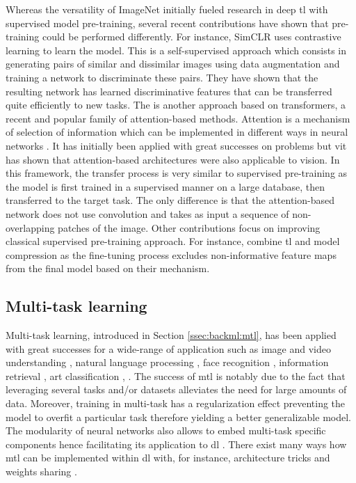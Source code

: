 Whereas the versatility of ImageNet initially fueled research in deep \acrlong{tl}
with supervised model pre-training, several recent contributions have shown that
pre-training could be performed differently. For instance, SimCLR \cite{chen2020simple}
uses contrastive learning to learn the model. This is a self-supervised approach
which consists in generating pairs of similar and dissimilar images using data
augmentation and training a network to discriminate these pairs. They have shown
that the resulting network has learned discriminative features that can be transferred
quite efficiently to new tasks. The  \cite{dosovitskiy2020image}
is another approach based on transformers, a recent and popular family of
attention-based methods. Attention is a mechanism of selection of information
which can be implemented in different ways in neural networks \cite{niu2021review}.
It has initially been applied with great successes on  problems
but \acrshort{vit} has shown that attention-based architectures were also applicable
to vision. In this framework, the transfer process is very similar to supervised
pre-training as the model is first trained in a supervised manner on a large
database, then transferred to the target task. The only difference is that the
attention-based network does not use convolution and takes as input a sequence of
non-overlapping patches of the image. Other contributions focus on improving
classical supervised pre-training approach. For instance, \citeauthor{wang2019pay} \cite{wang2019pay}
combine \acrlong{tl} and model compression as the fine-tuning process excludes
non-informative feature maps from the final model based on their 
mechanism.

\subsection{Multi-task learning}
\label{ssec:backml:dl:deepmultitask}

Multi-task learning, introduced in Section \ref{ssec:backml:mtl}, has been applied with great successes for a wide-range of application \cite{zhang2017survey} such as image and video understanding \cite{kokkinos2017ubernet}, natural language processing \cite{collobert2008unified}, face recognition \cite{zhu2012face, chen2014joint, zhang2014facial, ranjan2017hyperface}, information retrieval \cite{liu2015representation}, art classification \cite{strezoski2017omniart}, \etc. The success of \acrlong{mtl} is notably due to the fact that leveraging several tasks and/or datasets alleviates the need for large amounts of data. Moreover, training in multi-task has a regularization effect preventing the model to overfit a particular task therefore yielding a better generalizable model. The modularity of neural networks also allows to embed multi-task specific components hence facilitating its application to \acrlong{dl} \cite{caruana1997multitask, zhang2017survey}. There exist many ways how \acrlong{mtl} can be implemented within \acrlong{dl} with, for instance, architecture tricks \cite{misra2016cross, strezoski2019many} and weights sharing \cite{caruana1997multitask}.


